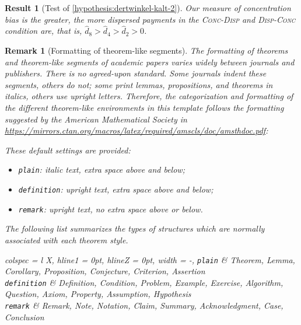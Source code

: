 \documentclass[12pt, a4paper, oneside]{article}
\newlength{\baselinedist}
\newlength{\smalllinespacing}
\renewenvironment{quotation}{%
	\list{}{%
		\leftmargin = \baselineskip%
		\rightmargin = \leftmargin%
		\listparindent = \smalllinespacing%
		\parsep = 0pt%
		\baselineskip = \smalllinespacing%
	}%
	\item\relax%
}{%
	\endlist%
}
\theoremstyle{Plain}
\theoremstyle{Definition}
\newtheorem{result}{Resultat}
\newtheorem{result}{Result}
\theoremstyle{Remark}
\newtheorem{remark}{Anmerkung}
\newtheorem{remark}{Remark}
\begin{document}
\begin{result}[Test of \autoref{hypothesis:dertwinkel-kalt-2}]
	\label{result:dertwinkel-kalt-2}
	Our measure of concentration bias is the greater, the more dispersed payments in the \textsc{Conc-Disp} and \textsc{Disp-Conc} condition are, that is, ${\hat{d}_8 > \hat{d}_4 > \hat{d}_2 > 0}$.
\end{result}

\begin{remark}[Formatting of theorem-like segments]
	\label{remark:formatting}
	The formatting of theorems and theorem-like segments of academic papers varies widely between journals and publishers. There is no agreed-upon standard. Some journals indent these segments, others do not; some print lemmas, propositions, and theorems in italics, others use upright letters. Therefore, the categorization and formatting of the different theorem-like environments in this template follows the formatting suggested by the American Mathematical Society in \url{https://mirrors.ctan.org/macros/latex/required/amscls/doc/amsthdoc.pdf}: \par
	\begin{quotation}
		These default settings are provided: \par\vskip7.5pt
		\begin{itemize}[leftmargin = \baselinedist, labelsep = 0.45\baselinedist]
			\item \texttt{plain}: italic text, extra space above and below;
			\item \texttt{definition}: upright text, extra space above and below;
			\item \texttt{remark}: upright text, no extra space above or below.
		\end{itemize} \par\vskip7.5pt
		\textellipsis \par
		The following list summarizes the types of structures which are normally
		associated with each theorem style. \par\vskip7.5pt
		\begin{tblr}{
			colspec = {l X},
			hline{1} = {0pt},
			hline{Z} = {0pt},
			width = \linewidth-\parindent,
		}
			\texttt{plain} &
			Theorem, Lemma, Corollary, Proposition, Conjecture, Criterion, Assertion
			\\
			\texttt{definition} &
			Definition, Condition, Problem, Example, Exercise, Algorithm, Question, Axiom, Property, Assumption, Hypothesis
			\\
			\texttt{remark} &
			Remark, Note, Notation, Claim, Summary, Acknowledgment, Case, Conclusion
		\end{tblr}
	\end{quotation}
\end{remark}
\end{document}
